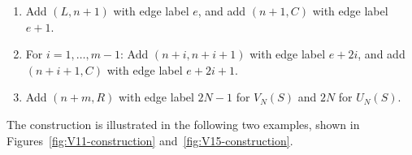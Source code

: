 \documentclass[11pt]{article}
\theoremstyle{definition}
\theoremstyle{plain}
\begin{document}
\begin{enumerate}[itemsep=0.35em, topsep=0.35em]
\begin{enumerate}
\item \label{it:left_arc} Add $(L, n+1)$ with edge label $e$, and add $(n+1,C)$ with edge label $e+1$.
\item \label{it:mid_arc} For $i = 1, \ldots, m-1$: Add $(n+i, n+i+1)$ with edge label $e+2i$, and add $(n+i+1,C)$ with edge label $e+2i+1$.
\item \label{it:right_arc} Add $(n+m, R)$ with edge label $2N-1$ for $V_N(S)$ and $2N$ for $U_N(S)$. 

\end{enumerate}
\end{enumerate}
\medskip

The construction is illustrated in the following two examples, shown in Figures~\ref{fig:V11-construction} and~\ref{fig:V15-construction}.
\end{document}
